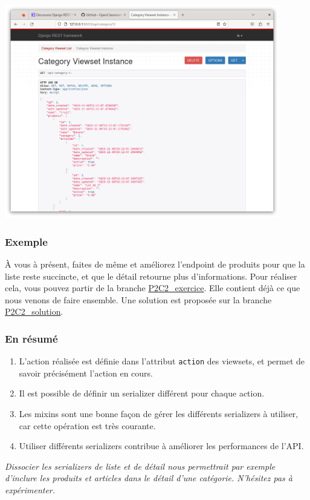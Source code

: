 \documentclass[a4paper]{article}
\begin{document}
\begin{center}
\includegraphics[width=12cm]{images/image18.png}
\end{center}

\subsubsection*{Exemple}
À vous à présent, faites de même et améliorez l'endpoint de produits pour que la liste reste succincte, et que le détail retourne plus d’informations. Pour réaliser cela, vous pouvez partir de la branche \href{https://github.com/OpenClassrooms-Student-Center/7192416\_APIs\_DRF/tree/P2C2\_exercice}{P2C2\_exercice}. Elle contient déjà ce que nous venons de faire ensemble. Une solution est proposée sur la branche \href{https://github.com/OpenClassrooms-Student-Center/7192416\_APIs\_DRF/tree/P2C1\_solution}{P2C2\_solution}.

\subsubsection*{En résumé}
\begin{enumerate}
\item L’action réalisée est définie dans l’attribut {\tt action}  des viewsets, et permet de savoir précisément l’action en cours.
\item Il est possible de définir un serializer différent pour chaque action.
\item Les mixins sont une bonne façon de gérer les différents serializers à utiliser, car cette opération est très courante.
\item Utiliser différents serializers contribue à améliorer les performances de l’API.
\end{enumerate}
{\em Dissocier les serializers de liste et de détail nous permettrait par exemple d’inclure les produits et articles dans le détail d’une catégorie. N’hésitez pas à expérimenter. }
\end{document}

